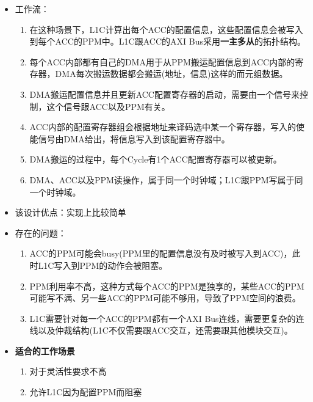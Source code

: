 \documentclass[a4paper, 12pt]{article}
\begin{document}
\begin{itemize}
  \item 工作流：
       \begin{enumerate}
          \item 在这种场景下，L1C计算出每个ACC的配置信息，这些配置信息会被写入到每个ACC的PPM中。L1C跟ACC的AXI Bus采用\textbf{一主多从}的拓扑结构。
          \item 每个ACC内部都有自己的DMA用于从PPM搬运配置信息到ACC内部的寄存器，DMA每次搬运数据都会搬运(地址，信息)这样的而元组数据。
          \item DMA搬运配置信息并且更新ACC配置寄存器的启动，需要由一个信号来控制，这个信号跟ACC以及PPM有关。
          \item ACC内部的配置寄存器组会根据地址来译码选中某一个寄存器，写入的使能信号由DMA给出，将信息写入到该配置寄存器中。
          \item DMA搬运的过程中，每个Cycle有1个ACC配置寄存器可以被更新。
          \item DMA、ACC以及PPM读操作，属于同一个时钟域；L1C跟PPM写属于同一个时钟域。
       \end{enumerate}
  \item 该设计优点：实现上比较简单
  \item 存在的问题：
    \begin{enumerate}
      \item ACC的PPM可能会busy(PPM里的配置信息没有及时被写入到ACC)，此时L1C写入到PPM的动作会被阻塞。
      \item PPM利用率不高，这种方式每个ACC的PPM是独享的，某些ACC的PPM可能写不满、另一些ACC的PPM可能不够用，导致了PPM空间的浪费。
      \item L1C需要针对每一个ACC的PPM都有一个AXI Bus连线，需要更复杂的连线以及仲裁结构(L1C不仅需要跟ACC交互，还需要跟其他模块交互)。
    \end{enumerate}
  \item \textbf{适合的工作场景}
    \begin{enumerate}
      \item 对于灵活性要求不高
      \item 允许L1C因为配置PPM而阻塞
    \end{enumerate}
\end{itemize}
\end{document}
